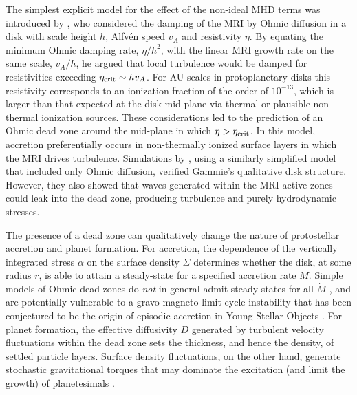 The simplest explicit model for the effect of the non-ideal MHD terms was introduced by \citet{gammie96}, who considered the damping of the MRI by Ohmic diffusion in a disk with scale height $h$, Alfv\'en speed $v_A$ and resistivity $\eta$. By equating the minimum Ohmic damping rate, $\eta / h^2$, with the linear MRI growth rate on the same scale, $v_A/h$, he argued that local turbulence would be damped for resistivities exceeding $\eta_{\rm crit} \sim h v_A$. For AU-scales in 
protoplanetary disks this resistivity corresponds to an ionization fraction of the order of $10^{-13}$, which is larger 
than that expected at the disk mid-plane via thermal or plausible non-thermal ionization sources.  These
considerations led to the prediction of an Ohmic dead zone around the mid-plane in which $\eta > \eta_{\rm crit}$.  In this model, accretion preferentially occurs in non-thermally ionized surface layers in which the MRI drives turbulence. Simulations by \citet{fleming03}, using a similarly simplified model that included only Ohmic diffusion, verified Gammie's qualitative disk structure. However, they also showed that waves generated within the MRI-active zones could leak into the dead zone, producing turbulence and purely hydrodynamic stresses.

The presence of a dead zone can qualitatively change the nature of protostellar accretion and planet 
formation. For accretion, the dependence of the vertically integrated stress $\alpha$ \citep{shakura73} on the surface 
density $\Sigma$ determines whether the disk, at some radius $r$, is able to attain a steady-state for a 
specified accretion rate $\dot{M}$. Simple models of Ohmic dead zones do {\em not} in general admit 
steady-states for all $\dot{M}$ \citep{gammie96}, and are potentially vulnerable to a gravo-magneto limit cycle instability 
\citep{martin11} that has been conjectured to be the origin of episodic accretion in Young Stellar 
Objects \citep{armitage01,zhu09}. For planet formation, the effective diffusivity $D$ generated by 
turbulent velocity fluctuations within the dead zone sets the thickness, and hence the density, of 
settled particle layers. Surface density fluctuations, on the other hand, generate stochastic gravitational 
torques that may dominate the excitation (and limit the growth) of planetesimals \citep{ida08,gressel11,gressel12,okuzumi13}.

